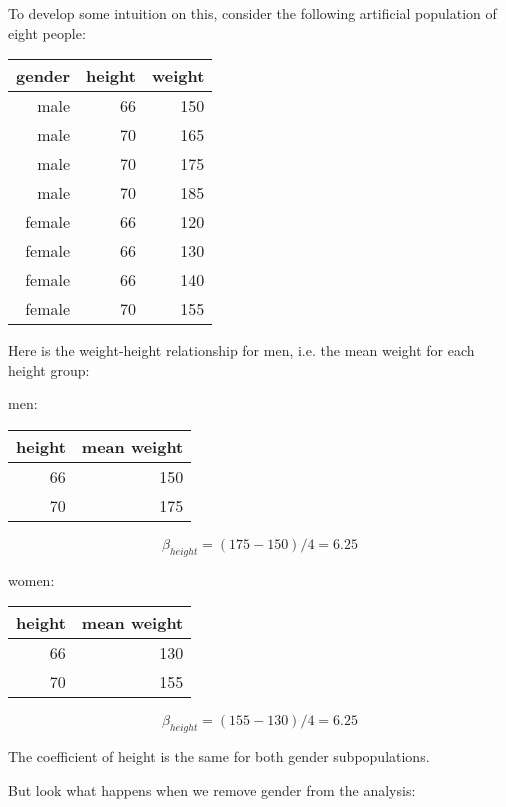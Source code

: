 To develop some intuition on this, consider the following artificial
population of eight people:

\bigskip

\begin{tabular}{|r|r|r|}
\hline
gender & height & weight \\ \hline 
male & 66 & 150 \\ \hline 
male & 70 & 165 \\ \hline 
male & 70 & 175 \\ \hline 
male & 70 & 185 \\ \hline 
female & 66 & 120 \\ \hline 
female & 66 & 130 \\ \hline 
female & 66 & 140 \\ \hline 
female & 70 & 155 \\ \hline 
\end{tabular}

\bigskip

Here is the weight-height relationship for men, i.e. the mean weight for
each height group:

\bigskip

men:

\begin{tabular}{|r|r|}
\hline
height & mean weight \\ \hline 
66 & 150 \\ \hline 
70 & 175 \\ \hline 
\end{tabular}

\begin{equation}
\beta_{height} = (175-150) / 4 = 6.25
\end{equation}

women:

\begin{tabular}{|r|r|}
\hline
height & mean weight \\ \hline 
66 & 130 \\ \hline 
70 & 155 \\ \hline 
\end{tabular}

\begin{equation}
\beta_{height} = (155-130) / 4 = 6.25
\end{equation}

\bigskip

The coefficient of height is the same for both gender subpopulations.

But look what happens when we remove gender from the analysis:

